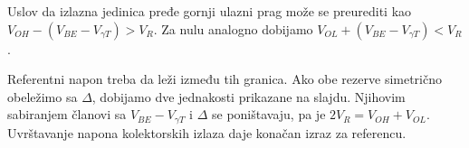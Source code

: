 Uslov da izlazna jedinica pređe gornji ulazni prag može se preurediti kao $V_{OH}-(V_{BE}-V_{\gamma T})>V_R$. Za nulu analogno dobijamo $V_{OL}+(V_{BE}-V_{\gamma T})<V_R$.

Referentni napon treba da leži između tih granica. Ako obe rezerve simetrično obeležimo sa $\Delta$, dobijamo dve jednakosti prikazane na slajdu. Njihovim sabiranjem članovi sa $V_{BE}-V_{\gamma T}$ i $\Delta$ se poništavaju, pa je $2V_R=V_{OH}+V_{OL}$. Uvrštavanje napona kolektorskih izlaza daje konačan izraz za referencu.
